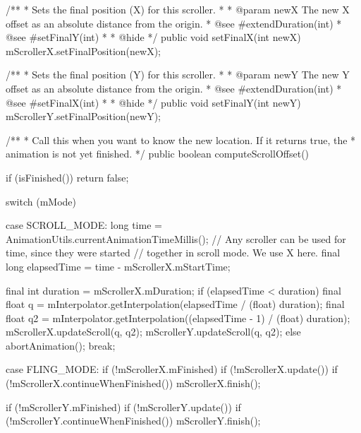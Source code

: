 {    /**
     * Sets the final position (X) for this scroller.
     *
     * @param newX The new X offset as an absolute distance from the origin.
     * @see #extendDuration(int)
     * @see #setFinalY(int)
     *
     * @hide
     */
    public void setFinalX(int newX) {
        mScrollerX.setFinalPosition(newX);
    }

    /**
     * Sets the final position (Y) for this scroller.
     *
     * @param newY The new Y offset as an absolute distance from the origin.
     * @see #extendDuration(int)
     * @see #setFinalX(int)
     *
     * @hide
     */
    public void setFinalY(int newY) {
        mScrollerY.setFinalPosition(newY);
    }

    /**
     * Call this when you want to know the new location. If it returns true, the
     * animation is not yet finished.
     */
    public boolean computeScrollOffset() {
        if (isFinished()) {
            return false;
        }

        switch (mMode) {
            case SCROLL_MODE:
                long time = AnimationUtils.currentAnimationTimeMillis();
                // Any scroller can be used for time, since they were started
                // together in scroll mode. We use X here.
                final long elapsedTime = time - mScrollerX.mStartTime;

                final int duration = mScrollerX.mDuration;
                if (elapsedTime < duration) {
                    final float q = mInterpolator.getInterpolation(elapsedTime / (float) duration);
                    final float q2 =
                            mInterpolator.getInterpolation((elapsedTime - 1) / (float) duration);
                    mScrollerX.updateScroll(q, q2);
                    mScrollerY.updateScroll(q, q2);
                } else {
                    abortAnimation();
                }
                break;

            case FLING_MODE:
                if (!mScrollerX.mFinished) {
                    if (!mScrollerX.update()) {
                        if (!mScrollerX.continueWhenFinished()) {
                            mScrollerX.finish();
                        }
                    }
                }

                if (!mScrollerY.mFinished) {
                    if (!mScrollerY.update()) {
                        if (!mScrollerY.continueWhenFinished()) {
                            mScrollerY.finish();
                        }
                    }
                }

}}}
